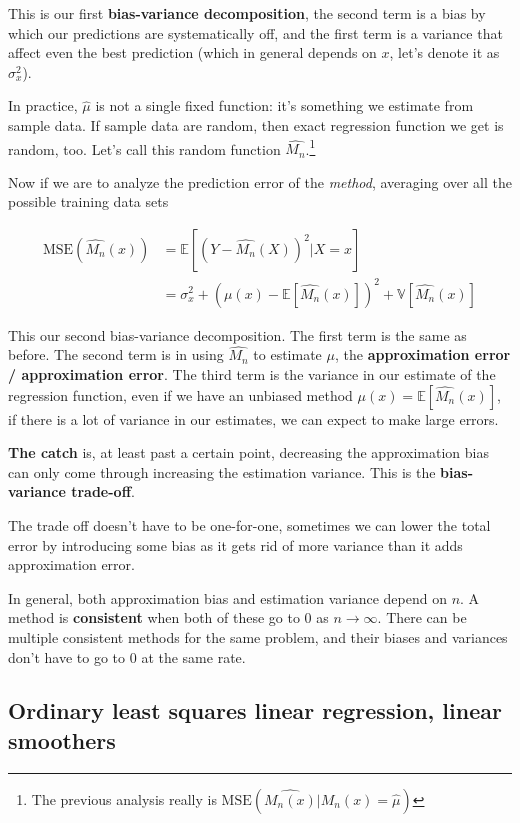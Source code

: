 \documentclass{article}
\begin{document}
This is our first \textbf{bias-variance decomposition}, the second term is a bias by which our predictions are systematically off, and the first term is a variance that affect even the best prediction (which in general depends on $x$, let's denote it as $\sigma_x^2$).

In practice, $\hat{\mu}$ is not a single fixed function: it's something we estimate from sample data.
If sample data are random, then exact regression function we get is random, too.
Let's call this random function $\hat{M_n}$.\footnote{The previous analysis really is $\text{MSE}(\hat{M_n(x)} | \hat{M_n(x)} = \hat{\mu})$}

Now if we are to analyze the prediction error of the \textit{method}, averaging over all the possible training data sets

\begin{align*}
\text{MSE}(\hat{M_n}(x)) &= \mathbb{E}[(Y - \hat{M_n}(X))^2 | X = x] \\
                         &= \sigma_x^2 + (\mu(x) - \mathbb{E}[\hat{M_n}(x)])^2 + \mathbb{V}[\hat{M_n}(x)]
\end{align*}

This our second bias-variance decomposition.
The first term is the same as before.
The second term is in using $\hat{M_n}$ to estimate $\mu$, the \textbf{approximation error / approximation error}.
The third term is the variance in our estimate of the regression function, even if we have an unbiased method $\mu(x) = \mathbb{E}[\hat{M_n}(x)]$, if there is a lot of variance in our estimates, we can expect to make large errors.

\textbf{The catch} is, at least past a certain point, decreasing the approximation bias can only come through increasing the estimation variance.
This is the \textbf{bias-variance trade-off}.

The trade off doesn't have to be one-for-one, sometimes we can lower the total error by introducing some bias as it gets rid of more variance than it adds approximation error.

In general, both approximation bias and estimation variance depend on $n$.
A method is \textbf{consistent} when both of these go to 0 as $n \to \infty$.
There can be multiple consistent methods for the same problem, and their biases and variances don't have to go to 0 at the same rate.


\subsection{Ordinary least squares linear regression, linear smoothers}
\end{document}

